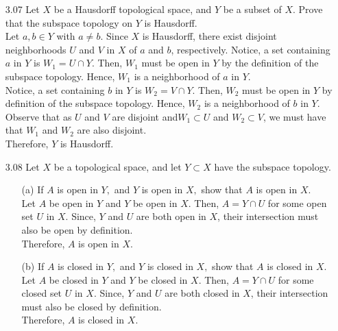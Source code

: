 \documentclass[12pt]{article}
\begin{document}
\begin{enumerate}
	\item[3.07] Let $X$ be a Hausdorff topological space, and $Y$ be a subset of $X .$ Prove that the subspace topology on $Y$ is Hausdorff.\\
	Let $ a,b\in Y $ with $ a \not= b $. Since $ X $ is Hausdorff, there exist disjoint neighborhoods $ U $ and $ V $ in $ X $ of $ a $ and $ b $, respectively. Notice, a set containing $ a $ in $ Y $ is $ W_1=U\cap Y $. Then, $ W_1 $ must be open in $ Y $ by the definition of the subspace topology. Hence, $ W_1 $ is a neighborhood of $ a $ in $ Y $. \\
	Notice, a set containing $ b $ in $ Y $ is $ W_2=V\cap Y $. Then, $ W_2 $ must be open in $ Y $ by definition of the subspace topology. Hence, $ W_2 $ is a neighborhood of $ b $ in $ Y $.\\
	Observe that as $ U $ and $V$ are disjoint and$ W_1 \subset U $ and $ W_2 \subset V $, we must have that $ W_1 $ and $ W_2 $ are also disjoint.\\
	Therefore, $ Y $ is Hausdorff.

	\item[3.08] Let $X$ be a topological space, and let $Y \subset X$ have the subspace topology.
		\begin{enumerate}
			\item[(a)] If $A$ is open in $Y ,$ and $Y$ is open in $X ,$ show that $A$ is open in $X .$\\
			Let $ A $ be open in $ Y $ and $ Y $ be open in $ X $. Then, $ A=Y\cap U $ for some open set $ U $ in $ X $. Since, $ Y $ and $ U $ are both open in $ X $, their intersection must also be open by definition.\\
			Therefore, $ A $ is open in $ X $.
			
			\item[(b)] If $A$ is closed in $Y ,$ and $Y$ is closed in $X ,$ show that $A$ is closed in $X .$\\
				Let $ A $ be closed in $ Y $ and $ Y $ be closed in $ X $. Then, $ A=Y\cap U $ for some closed set $ U $ in $ X $. Since, $ Y $ and $ U $ are both closed in $ X $, their intersection must also be closed by definition.\\
				Therefore, $ A $ is closed in $ X $.
		\end{enumerate}


\end{enumerate}
\end{document}
